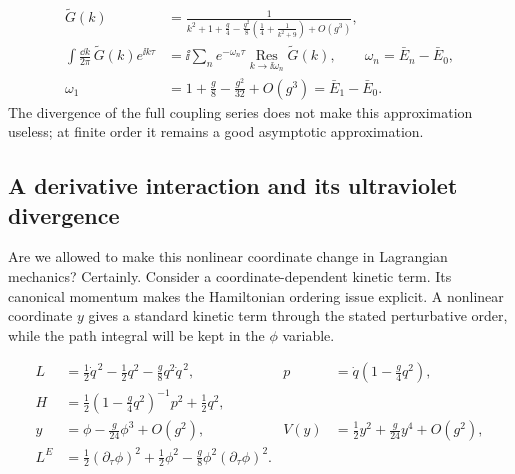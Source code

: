 \begin{align}
  \widetilde G(k)
  &=\frac1{k^2+1+\frac g4-\frac{g^2}{8}
  \left(\frac14+\frac1{k^2+9}\right)+O(g^3)},
  \label{eq:253a-ch02-dressed-propagator}\\
  \int\frac{\dd k}{2\pi}\,\widetilde G(k)e^{\ii k\tau}
  &=\ii\sum_n e^{-\omega_n\tau}
  \underset{k\to \ii\omega_n}{\operatorname{Res}}\widetilde G(k),
  \qquad \omega_n=\bar E_n-\bar E_0,
  \label{eq:253a-ch02-pole-spectral-map}\\
  \omega_1&=1+\frac g8-\frac{g^2}{32}+O(g^3)
  =\bar E_1-\bar E_0.
  \label{eq:253a-ch02-first-interacting-gap}
\end{align}
The divergence of the full coupling series does not make this approximation useless; at finite order it remains a good asymptotic approximation.

\subsection{A derivative interaction and its ultraviolet divergence}

Are we allowed to make this nonlinear coordinate change in Lagrangian mechanics? Certainly. Consider a coordinate-dependent kinetic term. Its canonical momentum makes the Hamiltonian ordering issue explicit. A nonlinear coordinate $y$ gives a standard kinetic term through the stated perturbative order, while the path integral will be kept in the $\phi$ variable.

\begin{align}
  L&=\frac12\dot q^{\,2}-\frac12q^2-\frac g8q^2\dot q^{\,2},
  &p&=\dot q\left(1-\frac g4q^2\right),
  \label{eq:253a-ch02-derivative-model}\\
  H&=\frac12\left(1-\frac g4q^2\right)^{-1}p^2+\frac12q^2,
  \label{eq:253a-ch02-derivative-hamiltonian}\\
  y&=\phi-\frac g{24}\phi^3+O(g^2),
  &V(y)&=\frac12y^2+\frac g{24}y^4+O(g^2),
  \label{eq:253a-ch02-coordinate-redefinition}\\
  L^E&=\frac12(\partial_\tau\phi)^2+\frac12\phi^2
  -\frac g8\phi^2(\partial_\tau\phi)^2.
  \label{eq:253a-ch02-derivative-euclidean-action}
\end{align}

